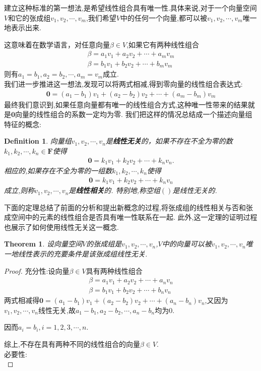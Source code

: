 \documentclass{ctexart}
\newtheorem{theorem}{Theorem}
\newtheorem{definition}{Definition}
\begin{document}
\noindent 建立这种标准的第一想法,是希望线性组合具有唯一性.具体来说,对于一个向量空间$V$和它的张成组$v_1,v_2,\cdots,v_m$,我们希望$V$中的任何一个向量,都可以被$v_1,v_2,\cdots,v_m$唯一地表示出来.

\noindent 这意味着在数学语言，对任意向量$\beta \in V$,如果它有两种线性组合
\begin{align*}
    \beta=a_1v_1+a_2v_2+\cdots+a_mv_m\\
    \beta=b_1v_1+b_2v_2+\cdots+b_mv_m
\end{align*}
则有$a_1=b_1,a_2=b_2,\cdots,a_m=v_m$成立.\\

\noindent 我们进一步推进这一想法,发现可以将两式相减,得到零向量的线性组合表达式:
\begin{align*}
    \mathbf{0}=(a_1-b_1)v_1+(a_2-b_2)v_2+\cdots+(a_m-b_m)v_m
\end{align*}
\noindent 最终我们意识到,如果任意向量都有唯一的线性组合方式,这种唯一性带来的结果就是$\mathbf{0}$向量的线性组合的系数一定均为零. 我们把这样的情况总结成一个描述向量组特征的概念:
\begin{definition}
    向量组$v_1,v_2,\cdots,v_n$是\textbf{线性无关}的，如果不存在不全为零的数$k_1,k_2,\cdots,k_n \in \mathbf{F}$使得
    \begin{align*}
        \mathbf{0}=k_1v_1+k_2v_2+\cdots+k_nv_n.
    \end{align*}
    相应的,如果存在不全为零的一组数$k_1,k_2,\cdots,k_n$使得
    \begin{align*}
        \mathbf{0}=k_1v_1+k_2v_2+\cdots+k_nv_n
    \end{align*}
    成立,则称$v_1,v_2,\cdots,v_n$是\textbf{线性相关}的. 特别地,称空组$()$是线性无关的.\\
\end{definition}

\noindent 下面的定理总结了前面的分析和提出新概念的过程,将张成组的线性相关与否和张成空间中的元素的线性组合是否具有唯一性联系在一起. 此外,这一定理的证明过程也展示了如何使用线性无关这一概念.

\begin{theorem}%
    设向量空间$V$的张成组是$v_1,v_2,\cdots,v_n$,$V$中的向量可以被$v_1,v_2,\cdots,v_n$唯一地线性表示的充要条件是该张成组线性无关.
\end{theorem}

\begin{proof}

    \noindent 充分性:设向量$\beta \in V$具有两种线性组合
    \begin{align*}
        \beta=a_1v_1+a_2v_2+\cdots+a_nv_n\\
        \beta=b_1v_1+b_2v_2+\cdots+b_nv_n
    \end{align*}
        两式相减得$\mathbf{0}=(a_1-b_1)v_1+(a_2-b_2)v_2+\cdots+(a_n-b_n)v_n$,又因为$v_1,v_2,\cdots,v_n$线性无关,故$a_1-b_1,a_2-b_2,\cdots,a_n-b_n$均为$0$.
    
    \noindent 因而$a_i=b_i,i=1,2,3,\cdots,n$.
    
    \noindent 综上,不存在具有两种不同的线性组合的向量$\beta \in V$.\\
    

    \noindent 必要性:\\
\end{proof}
\end{document}
